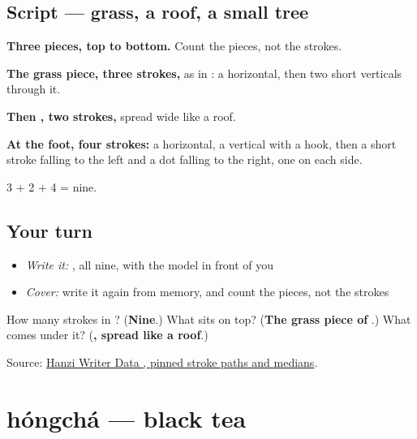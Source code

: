 \subsection*{Script — grass, a roof, a small tree}

\begin{quote}
\end{quote}

\textbf{Three pieces, top to bottom.} Count the pieces, not the strokes.

\textbf{The grass piece, three strokes,} as in : a horizontal, then two short verticals through it.

\textbf{Then , two strokes,} spread wide like a roof.

\textbf{At the foot, four strokes:} a horizontal, a vertical with a hook, then a short stroke falling to the left and a dot falling to the right, one on each side.

3 + 2 + 4 = nine.

\subsection*{Your turn}
\begin{itemize}
\raggedright
  \item \emph{Write it:} , all nine, with the model in front of you
  \item \emph{Cover:} write it again from memory, and count the pieces, not the strokes
\end{itemize}

\begin{tcolorbox}[breakable,colback=teal!4,colframe=teal!35!black,title={Before you move on}]
How many strokes in ? (\textbf{Nine}.) What sits on top? (\textbf{The grass piece of }.) What comes under it? (\textbf{, spread like a roof}.)

Source: \href{https://raw.githubusercontent.com/chanind/hanzi-writer-data/68d10a4b21150cae5e1ebbd223eed289cf32d90c/data/\%E8\%8C\%B6.json}{Hanzi Writer Data , pinned stroke paths and medians}.
\end{tcolorbox}
\section[hóngchá]{hóngchá — black tea}

\label{lesson:ZH-C166-hongcha}



